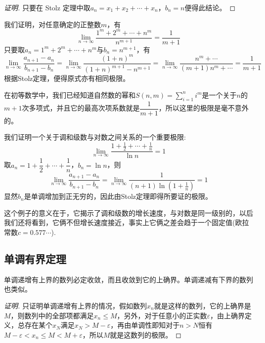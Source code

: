 \begin{proof}[证明]
  只要在 Stolz 定理中取$a_n=x_1+x_2+\cdots+x_n$，$b_n=n$便得此结论。
\end{proof}

\begin{example}
  我们证明，对任意确定的正整数$m$，有
  \[ \lim_{n \to \infty} \frac{1^m+2^m+\cdots+n^m}{n^{m+1}} = \frac{1}{m+1} \]
  只要取$a_n=1^m+2^m+\cdots+n^m$与$b_n=n^{m+1}$，有
  \[ \lim_{n \to \infty} \frac{a_{n+1}-a_n}{b_{n+1}-b_n} = \lim_{n \to \infty} \frac{(1+n)^m}{(1+n)^{m+1}-n^{m+1}} = \lim_{n \to \infty} \frac{n^m+\cdots}{(m+1)n^m+\cdots} = \frac{1}{m+1} \]
  根据Stolz定理，便得原式亦有相同极限。

  在初等数学中，我们已经知道自然数的幂和$S(n,m)=\sum\limits_{i=1}^ni^m$是一个关于$n$的$m+1$次多项式，并且它的最高次项系数就是$\dfrac{1}{m+1}$，所以这里的极限是毫不意外的。
\end{example}

\begin{example}
  我们证明一个关于调和级数与对数之间关系的一个重要极限:
  \[ \lim_{n \to \infty} \frac{1+\frac{1}{2}+\cdots+\frac{1}{n}}{\ln{n}} = 1 \]
  取$a_n=1+\dfrac{1}{2}+\cdots+\dfrac{1}{n}$，$b_n=\ln{n}$，则
  \[ \lim_{n \to \infty} \frac{a_{n+1}-a_n}{b_{n+1}-b_n} = \lim_{n \to \infty} \frac{1}{(n+1)\ln{\left( 1+ \frac{1}{n} \right)}} = 1 \]
  显然$b_n$是单调增加到正无穷的，因此由Stolz定理即得所要证的极限。

  这个例子的意义在于，它揭示了调和级数的增长速度，与对数是同一级别的，以后我们还将看到，它俩不但增长速度接近，事实上它俩之差会趋于一个固定值(欧拉常数$c=0.577\cdots$).
\end{example}


\subsection{单调有界定理}
\label{sec:theorem-of-monotone-bounded}

\begin{theorem}
  单调递增有上界的数列必定收敛，而且收敛到它的上确界。单调递减有下界的数列也类似。
\end{theorem}

\begin{proof}[证明]
  只证明单调递增有上界的情况，假如数列$x_n$就是这样的数列，它的上确界是$M$，则数列中的全部项都满足$x_n \leqslant M$，另外，对于任意小的正实数$\varepsilon$，由上确界定义，总存在某个$x_N$满足$x_N>M-\varepsilon$，再由单调性即知对于$n>N$恒有$M-\varepsilon < x_n \leqslant M < M+\varepsilon$，所以$M$就是这数列的极限。
\end{proof}


